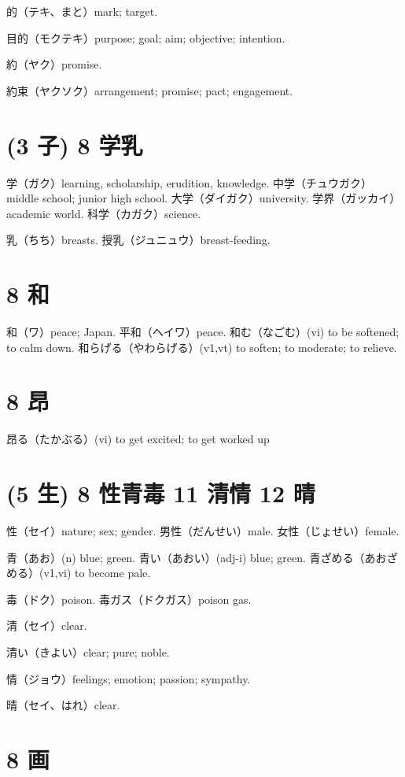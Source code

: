 的（テキ、まと）mark; target.

目的（モクテキ）purpose; goal; aim; objective; intention.

約（ヤク）promise.

約束（ヤクソク）arrangement; promise; pact; engagement.

\section{(3 子) 8 学乳}

学（ガク）learning, scholarship, erudition, knowledge.
中学（チュウガク）middle school; junior high school.
大学（ダイガク）university.
学界（ガッカイ）academic world.
科学（カガク）science.

乳（ちち）breasts.
授乳（ジュニュウ）breast-feeding.

\section{8 和}

和（ワ）peace; Japan.
平和（ヘイワ）peace.
和む（なごむ）(vi) to be softened; to calm down.
和らげる（やわらげる）(v1,vt) to soften; to moderate; to relieve.

\section{8 昂}

昂る（たかぶる）(vi) to get excited; to get worked up

\section{(5 生) 8 性青毒 11 清情 12 晴}

性（セイ）nature; sex; gender.
男性（だんせい）male.
女性（じょせい）female.

青（あお）(n) blue; green.
青い（あおい）(adj-i) blue; green.
青ざめる（あおざめる）(v1,vi) to become pale.

毒（ドク）poison.
毒ガス（ドクガス）poison gas.

清（セイ）clear.

清い（きよい）clear; pure; noble.

情（ジョウ）feelings; emotion; passion; sympathy.

晴（セイ、はれ）clear.

\section{8 画}

